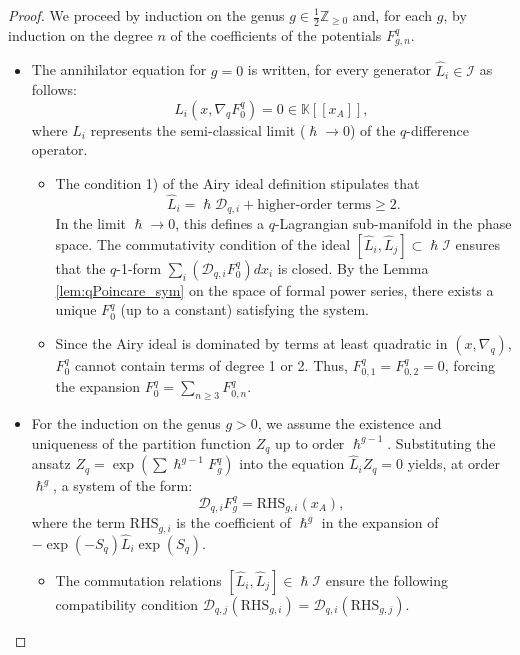 \documentclass[reqno,11pt]{amsart}
\theoremstyle{plain}
\theoremstyle{definition}
\theoremstyle{remark}
\numberwithin{equation}{section}
\newcommand{\1}{\mathds{1}}
\newcommand{\2}{\frac{1}{2}}
\begin{document}
{				\begin{proof}
					{We proceed by induction on the genus $g \in \frac{1}{2}\mathbb{Z}_{\geq 0}$ and, for each $g$, by induction on the degree $n$ of the coefficients of the potentials $F_{g,n}^q$.
						\begin{itemize}
							\item[(1)]
							The annihilator equation for $g=0$ is written, for every generator $\widehat{L}_i \in \mathcal{I}$ as follows:
							\begin{equation}
								L_i(x, \nabla_q F_0^q) = 0 \in \mathbb{K}[[x_A]],
							\end{equation}
							where $L_i$ represents the semi-classical limit ($\hslash \to 0$) of the $q$-difference operator. 
							\begin{itemize}
								\item[(a)] The condition 1) of the Airy ideal definition stipulates that $$\widehat{L}_i = \hslash \mathcal{D}_{q,i} + \text{higher-order terms} \geq 2.$$ In the limit $\hslash \to 0$, this defines a $q$-Lagrangian sub-manifold in the phase space. The commutativity condition of the ideal $[\widehat{L}_i, \widehat{L}_j] \subset \hslash \mathcal{I}$ ensures that the $q$-1-form $\sum_i (\mathcal{D}_{q,i} F_0^q) dx_i$ is closed. By the Lemma \ref{lem:qPoincare_sym} on the space of formal power series, there exists a unique $F_0^q$ (up to a constant) satisfying the system.
								\item[(b)] Since the Airy ideal is dominated by terms at least quadratic in $(x, \nabla_q)$, $F_0^q$ cannot contain terms of degree 1 or 2. Thus, $F_{0,1}^q = F_{0,2}^q = 0$, forcing the expansion $F_0^q = \sum_{n \geq 3} F_{0,n}^q$.
							\end{itemize}
							\item[(2)] For the induction on the genus $g > 0$, we assume the existence and uniqueness of the partition function $Z_q$ up to order $\hslash^{g-1}$. Substituting the ansatz $Z_q = \exp\left( \sum \hslash^{g-1} F_g^q \right)$ into the equation $\widehat{L}_i Z_q = 0$ yields, at order $\hslash^g$, a system of the form:
							\begin{equation}
								\label{eq:RHS_q_en}
								\mathcal{D}_{q,i} F_g^q = \text{RHS}_{g,i}(x_A),
							\end{equation}
							where the term $\text{RHS}_{g,i}$ is the coefficient of $\hslash^g$ in the expansion of $-\exp(-S_q) \widehat{L}_i \exp(S_q)$. 
							\begin{itemize}
								\item[(i)] The commutation relations $[\widehat{L}_{i}, \widehat{L}_{j}] \in \hslash \mathcal{I}$ ensure the following compatibility condition $\mathcal{D}_{q,j} (\text{RHS}_{g,i}) = \mathcal{D}_{q,i} (\text{RHS}_{g,j})$. 

\end{itemize}
\end{itemize}}
\end{proof}}
\end{document}
